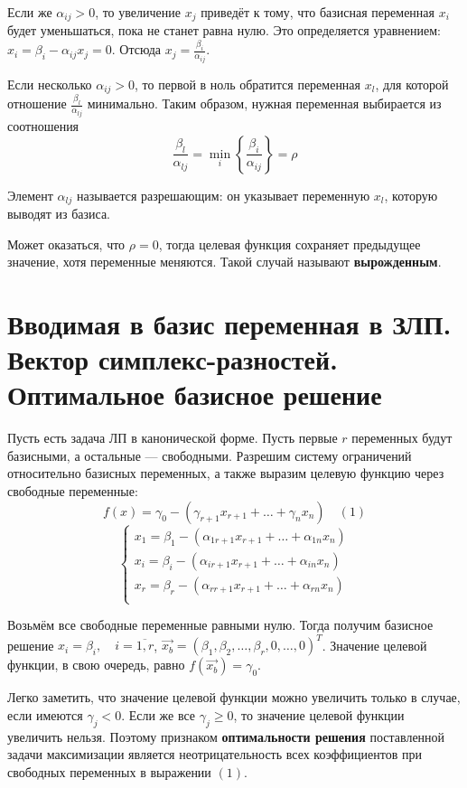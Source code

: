 \documentclass[17pt]{extarticle}
\begin{document}
Если же \( \alpha_{ij} > 0 \), то увеличение \( x_j \) приведёт к тому, что базисная переменная \( x_i \) будет уменьшаться, пока не станет равна нулю. Это определяется уравнением: \( x_i = \beta_i - \alpha_{ij} x_j = 0 \). Отсюда \( x_j = \frac{\beta_i}{\alpha_{ij}} \).

Если несколько \( \alpha_{ij} > 0 \), то первой в ноль обратится переменная \( x_l \), для которой отношение \( \frac{\beta_l}{\alpha_{lj}} \) минимально. Таким образом, нужная переменная выбирается из соотношения
\[
    \frac{\beta_l}{\alpha_{lj}} = \min\limits_i \left\{ \frac{\beta_i}{\alpha_{ij}} \right\} = \rho
\]

Элемент \( \alpha_{lj} \) называется разрешающим: он указывает переменную \( x_l \), которую выводят из базиса.

Может оказаться, что \( \rho = 0 \), тогда целевая функция сохраняет предыдущее значение, хотя переменные меняются. Такой случай называют \textbf{вырожденным}.




\section{Вводимая в базис переменная в ЗЛП. Вектор симплекс-разностей. Оптимальное базисное решение}

Пусть есть задача ЛП в канонической форме. Пусть первые \( r \) переменных будут базисными, а остальные — свободными. Разрешим систему ограничений относительно базисных переменных, а также выразим целевую функцию через свободные переменные:
\[
    f(x) = \gamma_0 - (\gamma_{r+1}x_{r+1} + \dots + \gamma_n x_n) \quad (1)
\]
\[
    \begin{cases}
        x_1 = \beta_1 - (\alpha_{1 r+1}x_{r+1} + \dots + \alpha_{1n}x_n) \\
        x_i = \beta_i - (\alpha_{i r+1}x_{r+1} + \dots + \alpha_{in}x_n) \\
        x_r = \beta_r - (\alpha_{r r+1}x_{r+1} + \dots + \alpha_{rn}x_n) \\
    \end{cases}
\]

Возьмём все свободные переменные равными нулю. Тогда получим базисное решение \( x_i = \beta_i, \quad i = \overline{1,r} \), \( \vec{x_b} = (\beta_1, \beta_2, \dots, \beta_r, 0, \dots, 0)^T \). Значение целевой функции, в свою очередь, равно \( f(\vec{x_b}) = \gamma_0 \).

Легко заметить, что значение целевой функции можно увеличить только в случае, если имеются \( \gamma_j < 0 \). Если же все \( \gamma_j \ge 0 \), то значение целевой функции увеличить нельзя. Поэтому признаком \textbf{оптимальности решения} поставленной задачи максимизации является неотрицательность всех коэффициентов при свободных переменных в выражении \( (1) \).
\end{document}

